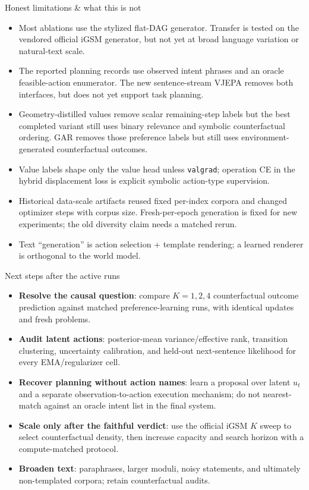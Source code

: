 \documentclass[aspectratio=169,10pt]{beamer}
\begin{document}
\begin{frame}{Honest limitations \& what this is not}
\begin{itemize}\itemsep2pt
  \item Most ablations use the stylized flat-DAG generator. Transfer is tested
        on the vendored official iGSM generator, but not yet at broad language
        variation or natural-text scale.
  \item The reported planning records use observed intent phrases and an
        oracle feasible-action enumerator. The new sentence-stream VJEPA removes
        both interfaces, but does not yet support task planning.
  \item Geometry-distilled values remove scalar remaining-step labels but the
        best completed variant still uses binary relevance and symbolic
        counterfactual ordering. GAR removes those preference labels but still
        uses environment-generated counterfactual outcomes.
  \item Value labels shape only the value head unless \texttt{valgrad};
        operation CE in the hybrid displacement loss is explicit symbolic
        action-type supervision.
  \item Historical data-scale artifacts reused fixed per-index corpora and
        changed optimizer steps with corpus size. Fresh-per-epoch generation is
        fixed for new experiments; the old diversity claim needs a matched rerun.
  \item Text ``generation'' is action selection + template rendering; a
        learned renderer is orthogonal to the world model.
\end{itemize}
\end{frame}

\begin{frame}{Next steps after the active runs}
\begin{itemize}\itemsep2pt
  \item \textbf{Resolve the causal question}: compare $K=1,2,4$
        counterfactual outcome prediction against matched preference-learning
        runs, with identical updates and fresh problems.
  \item \textbf{Audit latent actions}: posterior-mean variance/effective rank,
        transition clustering, uncertainty calibration, and held-out
        next-sentence likelihood for every EMA/regularizer cell.
  \item \textbf{Recover planning without action names}: learn a proposal over
        latent $u_t$ and a separate observation-to-action execution mechanism;
        do not nearest-match against an oracle intent list in the final system.
  \item \textbf{Scale only after the faithful verdict}: use the official iGSM
        $K$ sweep to select counterfactual density, then increase capacity and
        search horizon with a compute-matched protocol.
  \item \textbf{Broaden text}: paraphrases, larger moduli, noisy statements,
        and ultimately non-templated corpora; retain counterfactual audits.
\end{itemize}
\end{frame}
\end{document}
